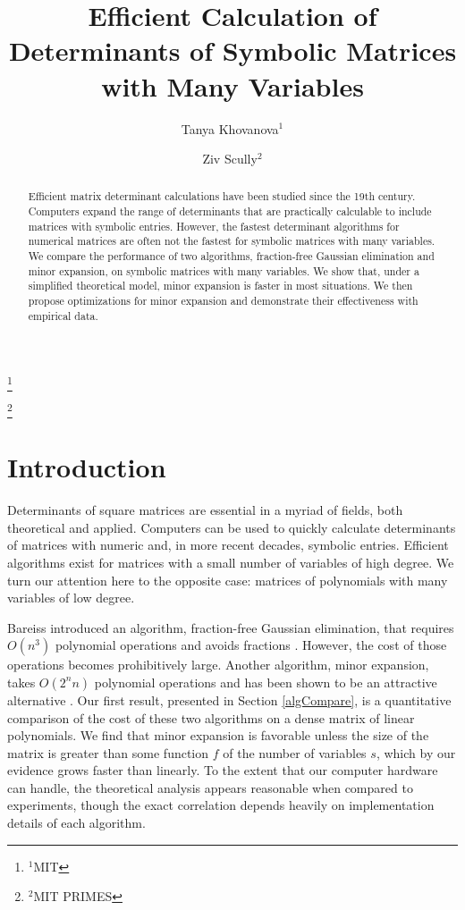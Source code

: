 \documentclass[12pt]{amsart}
\numberwithin{equation}{section}
\numberwithin{figure}{section}
\begin{document}
\title[Determinants with Many Variables]{Efficient Calculation of Determinants of Symbolic Matrices with Many Variables}
\author[Tanya Khovanova]{Tanya Khovanova$^1$}\thanks{$^1$MIT}
\author[Ziv Scully]{Ziv Scully$^2$}\thanks{$^2$MIT PRIMES}
\begin{abstract}
Efficient matrix determinant calculations have been studied since the 19th century. Computers expand the range of determinants that are practically calculable to include matrices with symbolic entries. However, the fastest determinant algorithms for numerical matrices are often not the fastest for symbolic matrices with many variables. We compare the performance of two algorithms, fraction-free Gaussian elimination and minor expansion, on symbolic matrices with many variables. We show that, under a simplified theoretical model, minor expansion is faster in most situations. We then propose optimizations for minor expansion and demonstrate their effectiveness with empirical data.
\end{abstract}
\maketitle


\section{Introduction}
Determinants of square matrices are essential in a myriad of fields, both theoretical and applied. Computers can be used to quickly calculate determinants of matrices with numeric and, in more recent decades, symbolic entries. Efficient algorithms exist for matrices with a small number of variables of high degree. We turn our attention here to the opposite case: matrices of polynomials with many variables of low degree.

Bareiss introduced an algorithm, fraction-free Gaussian elimination, that requires $O(n^3)$ polynomial operations and avoids fractions \cite{bareiss}. However, the cost of those operations becomes prohibitively large. Another algorithm, minor expansion, takes $O(2^nn)$ polynomial operations and has been shown to be an attractive alternative \cite{gentleman-johnson}. Our first result, presented in Section \ref{algCompare}, is a quantitative comparison of the cost of these two algorithms on a dense matrix of linear polynomials. We find that minor expansion is favorable unless the size of the matrix is greater than some function $f$ of the number of variables $s$, which by our evidence grows faster than linearly. To the extent that our computer hardware can handle, the theoretical analysis appears reasonable when compared to experiments, though the exact correlation depends heavily on implementation details of each algorithm.
\end{document}
